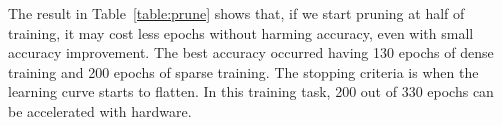 The result in Table~\ref{table:prune} shows that, if we start pruning at half of training, it may cost less epochs without harming accuracy, even with small accuracy improvement. The best accuracy occurred having 130 epochs of dense training and 200 epochs of sparse training. The stopping criteria is when the learning curve starts to flatten. In this training task, 200 out of 330 epochs can be accelerated with hardware.
